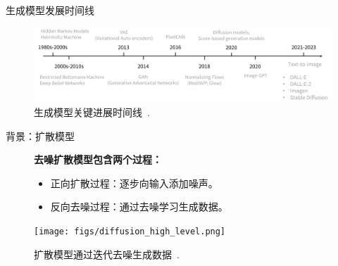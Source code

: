 \begin{refsection}
\begin{frame}{生成模型发展时间线}
  \begin{figure}
    \centering
    \includegraphics[width=0.95\linewidth]{figs/genai_timeline.png}
    \caption{\scriptsize 生成模型关键进展时间线~\parencite{dengPPTAdvancedNueralNetwork2024}.}
  \end{figure}
  \bottomleftrefs
\end{frame}
\end{refsection}




\begin{refsection}
\begin{frame}{背景：扩散模型}

  \begin{figure}
    \begin{minipage}{0.95\linewidth}
      \footnotesize
      \textbf{去噪扩散模型包含两个过程：}
      \begin{itemize}
        \item 正向扩散过程：逐步向输入添加噪声。
        \item 反向去噪过程：通过去噪学习生成数据。
      \end{itemize}
    \end{minipage}
    \vspace{2em}

    \centering
    \texttt{[image: figs/diffusion\_high\_level.png]}

    \caption[]{\scriptsize 扩散模型通过迭代去噪生成数据~\parencite{sohl2015deep,ho2020denoising}.}
  \end{figure}

  \bottomleftrefs
\end{frame}
\end{refsection}

